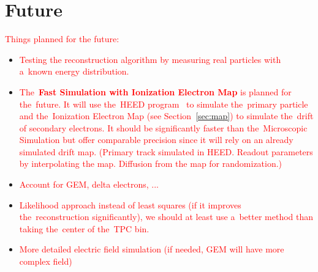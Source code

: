 	\section*{Future}
		\textcolor{red}{Things planned for the future:}
		\begin{itemize}[topsep=4pt,itemsep=2pt]
			\item \textcolor{red}{Testing the reconstruction algorithm by measuring real particles with a~known energy distribution.}
			\item \textcolor{red}{The~\textbf{Fast Simulation with Ionization Electron Map} is planned for the~future. It will use the~\ac{HEED} program~\cite{HEED} to simulate the~primary particle and the~Ionization Electron Map (see Section~\ref{sec:map}) to simulate the~drift of secondary electrons. It should be significantly faster than the~Microscopic Simulation but offer comparable precision since it will rely on an already simulated drift map. (Primary track simulated in HEED. Readout parameters by interpolating the map.	Diffusion from the map for randomization.)}
			\item \textcolor{red}{Account for GEM, delta electrons, ...}
			\item \textcolor{red}{Likelihood approach instead of least squares (if it improves the~reconstruction significantly), we should at least use a~better method than taking the~center of the~TPC bin.}
			\item \textcolor{red}{More detailed electric field simulation (if needed, GEM will have more complex field)}
		\end{itemize}
		
